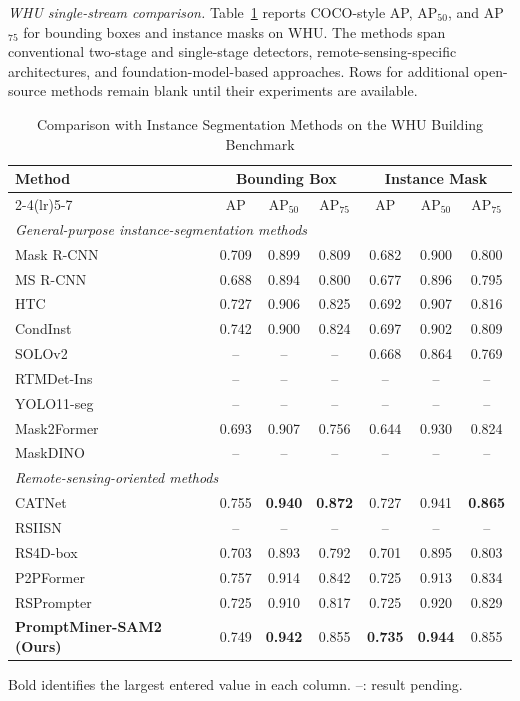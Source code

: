 \documentclass[letterpaper,journal]{IEEEtran}
\begin{document}
\noindent\textit{WHU single-stream comparison.}
\label{sec:whu}
Table~\ref{tab:whu} reports COCO-style AP, AP$_{50}$, and AP$_{75}$ for bounding boxes and
instance masks on WHU. The methods span conventional two-stage and single-stage detectors,
remote-sensing-specific architectures, and foundation-model-based approaches. Rows for
additional open-source methods remain blank until their experiments are available.

\begin{table}[!t]
\caption{Comparison with Instance Segmentation Methods on the WHU Building Benchmark}
\label{tab:whu}
\centering
\footnotesize
\begin{tabular}{lcccccc}
\toprule
\multirow{2}{*}{Method} & \multicolumn{3}{c}{Bounding Box} & \multicolumn{3}{c}{Instance Mask} \\
\cmidrule(lr){2-4}\cmidrule(lr){5-7}
& AP & AP$_{50}$ & AP$_{75}$ & AP & AP$_{50}$ & AP$_{75}$ \\
\midrule
\multicolumn{7}{l}{\textit{General-purpose instance-segmentation methods}} \\
Mask R-CNN~\cite{ref_maskrcnn} & 0.709 & 0.899 & 0.809 & 0.682 & 0.900 & 0.800 \\
MS R-CNN~\cite{ref_msrcnn} & 0.688 & 0.894 & 0.800 & 0.677 & 0.896 & 0.795 \\
HTC~\cite{ref_htc} & 0.727 & 0.906 & 0.825 & 0.692 & 0.907 & 0.816 \\
CondInst~\cite{ref_condinst} & 0.742 & 0.900 & 0.824 & 0.697 & 0.902 & 0.809 \\
SOLOv2~\cite{ref_solov2} & -- & -- & -- & 0.668 & 0.864 & 0.769 \\
RTMDet-Ins~\cite{ref_rtmdet} & -- & -- & -- & -- & -- & -- \\
YOLO11-seg~\cite{ref_yolo11} & -- & -- & -- & -- & -- & -- \\
Mask2Former~\cite{ref_mask2former} & 0.693 & 0.907 & 0.756 & 0.644 & 0.930 & 0.824 \\
MaskDINO~\cite{ref_maskdino} & -- & -- & -- & -- & -- & -- \\
\midrule
\multicolumn{7}{l}{\textit{Remote-sensing-oriented methods}} \\
CATNet~\cite{ref_catnet} & 0.755 & \textbf{0.940} & \textbf{0.872} & 0.727 & 0.941 & \textbf{0.865} \\
RSIISN~\cite{ref_rsiisn} & -- & -- & -- & -- & -- & -- \\
RS4D-box~\cite{ref_rs4d} & 0.703 & 0.893 & 0.792 & 0.701 & 0.895 & 0.803 \\
P2PFormer~\cite{ref_p2pformer} & 0.757 & 0.914 & 0.842 & 0.725 & 0.913 & 0.834 \\
RSPrompter~\cite{ref_rsprompter} & 0.725 & 0.910 & 0.817 & 0.725 & 0.920 & 0.829 \\
\midrule
\textbf{PromptMiner-SAM2 (Ours)} & 0.749 & \textbf{0.942} & 0.855 & \textbf{0.735} & \textbf{0.944} & 0.855 \\
\bottomrule
\end{tabular}
\par\smallskip\footnotesize Bold identifies the largest entered value in each column. --: result pending.
\end{table}
\end{document}
